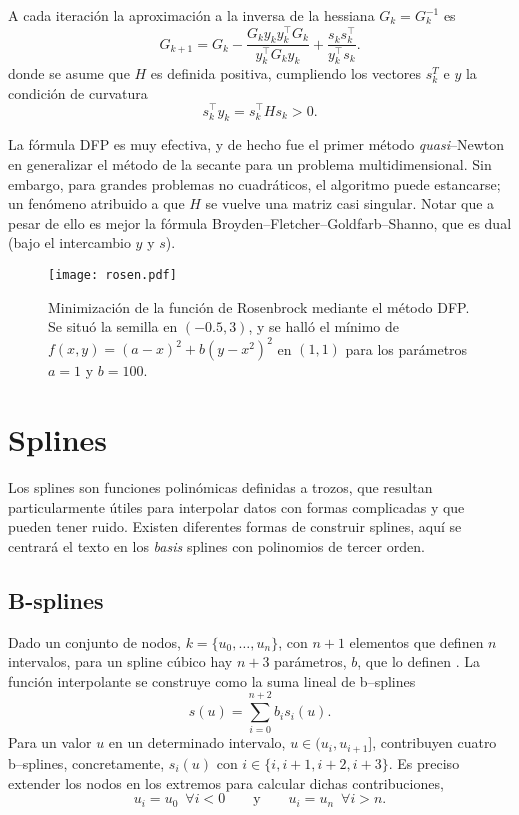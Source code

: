 A cada iteración la aproximación a la inversa de la hessiana $G_k = G_k^{-1}$ es
\begin{equation}
  G_{k+1} = G_k - \frac{G_k y_k y_k^{\top} G_k}{y_k^{\top} G_k y_k} + \frac{s_k s_k^{\top}}{y_k^{\top} s_k}.
\end{equation}
donde se asume que $H$ es definida positiva, cumpliendo los vectores  $s_k^T$ e $y$ la condición de curvatura
\begin{equation}
  s_k^{\top} y_k = s_k^{\top} H s_k > 0.
\end{equation}

La fórmula DFP es muy efectiva, y de hecho fue el primer método \textit{quasi}--Newton en generalizar el método de la secante para un problema multidimensional. Sin embargo, para grandes problemas no cuadráticos, el algoritmo puede estancarse; un fenómeno atribuido a que $H$ se vuelve una matriz casi singular. Notar que a pesar de ello es mejor la fórmula Broyden--Fletcher--Goldfarb--Shanno, que es dual (bajo el intercambio $y$ y $s$).



\begin{figure}[H]
  \centering
  \texttt{[image: rosen.pdf]}
  \caption{Minimización de la función de Rosenbrock mediante el método DFP. Se situó la semilla en $(-0.5,3)$, y se halló el mínimo de $f(x, y) = (a-x)^2 + b(y-x^2)^2$ en $(1,1)$ para los parámetros $a=1$ y $b=100$.}
\end{figure}



\section{Splines}

Los splines son funciones polinómicas definidas a trozos, que resultan particularmente útiles para interpolar datos con formas complicadas y que pueden tener ruido. Existen diferentes formas de construir splines, aquí se centrará el texto en los \textit{basis} splines con polinomios de tercer orden.


\subsection{B-splines}

Dado un conjunto de nodos, $k = \{u_0,\dots,u_n\}$, con $n+1$ elementos que definen $n$ intervalos, para un spline cúbico hay $n+3$ parámetros, $b$, que lo definen \cite{Weisstein}. La función interpolante  se construye como la suma lineal de b--splines \cite{paperPhis}
\begin{equation}
s(u) = \sum_{i=0}^{n+2}  b_i s_i(u).
\end{equation}
%
Para un valor $u$ en un determinado intervalo, $u \in (u_i,u_{i+1}]$, contribuyen cuatro b--splines, concretamente, $s_i(u)$ con $i \in \{i,i+1,i+2,i+3\}$. Es preciso extender los nodos en los extremos para calcular dichas contribuciones,
\[u_{i} = u_0 \,\,\, \forall i<0 \qquad \text{y} \qquad u_{i} = u_{n} \,\,\, \forall i>n.\]

